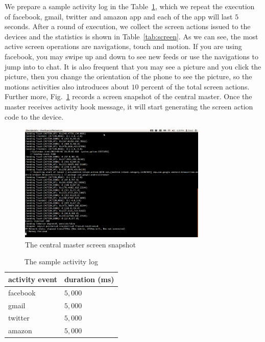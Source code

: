 We prepare a sample activity log in the Table~\ref{tab:log}, which we repeat the execution of facebook, gmail, twitter and amazon app and each of the app will last $5$ seconds. After a round of execution, we collect the screen actions issued to the devices and the statistics is shown in Table~\ref{tab:screen}. As we can see, the most active screen operations are navigations, touch and motion. If you are using facebook, you may swipe up and down to see new feeds or use the navigations to jump into to chat. It is also frequent that you may see a picture and you click the picture, then you change the orientation of the phone to see the picture, so the motions activities also introduces about $10$ percent of the total screen actions. Further more, Fig.~\ref{fig:master} records a screen snapshot of the central master. Once the master receives activity hook message, it will start generating the screen action code to the device.

\begin{figure}
\centering
\includegraphics[width=0.8\textwidth]{figures/master.png}
\caption{The central master screen snapshot}
\label{fig:master}
\end{figure}

\begin{table}
\centering
\caption{The sample activity log}
\begin{tabular}{ll}\toprule
activity event & duration (ms) \\\midrule
facebook & $5,000$ \\
gmail & $5,000$ \\
twitter & $5,000$ \\
amazon & $5,000$\\\bottomrule
\end{tabular}
\label{tab:log}
\end{table}

